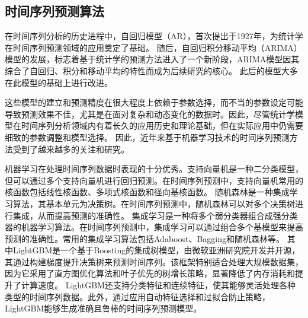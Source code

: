 \subsection{时间序列预测算法}
在时间序列分析的历史进程中，自回归模型\cite{PhysRevE.84.016106}（AR），首次提出于1927年，为统计学在时间序列预测领域的应用奠定了基础。
随后，自回归积分移动平均\cite{jiang2011multifractal}（ARIMA）模型的发展，标志着基于统计学的预测方法进入了一个新阶段，ARIMA模型因其综合了自回归、积分和移动平均的特性而成为后续研究的核心。
此后的模型大多在此模型的基础上进行改进。

这些模型的建立和预测精度在很大程度上依赖于参数选择，而不当的参数设定可能导致预测效果不佳，尤其是在面对复杂和动态变化的数据时。因此，尽管统计学模型在时间序列分析领域内有着长久的应用历史和理论基础，但在实际应用中仍需要细致的参数调整和模型选择。
因此，近年来基于机器学习技术的时间序列预测方法受到了越来越多的关注和研究。

机器学习在处理时间序列数据时表现的十分优秀。支持向量机\cite{zhang2020support}是一种二分类模型，但可以通过多个支持向量机进行回归预测\cite{sapankevych2009time}。在时间序列预测中，支持向量机常用的核函数包括线性核函数、多项式核函数和径向基核函数。
随机森林\cite{genuer2020random}是一种集成学习算法，其基本单元为决策树。在时间序列预测中，随机森林可以对多个决策树进行集成，从而提高预测的准确性\cite{khashei2019comparative}。
集成学习\cite{dong2020survey}是一种将多个弱分类器组合成强分类器的机器学习算法。在时间序列预测中，集成学习可以通过组合多个基模型来提高预测的准确性\cite{galicia2019multi}。常用的集成学习算法包括Adaboost、Bagging和随机森林等。
其中LightGBM\cite{ke2017lightgbm}是一个基于Boosting的集成树模型，由微软亚洲研究院开发并开源，其通过构建梯度提升决策树来预测时间序列。该框架特别适合处理大规模数据集，因为它采用了直方图优化算法和叶子优先的树增长策略，显著降低了内存消耗和提升了计算速度。
LightGBM还支持分类特征和连续特征，使其能够灵活处理各种类型的时间序列数据。此外，通过应用自动特征选择和过拟合防止策略，LightGBM能够生成准确且鲁棒的时间序列预测模型。

